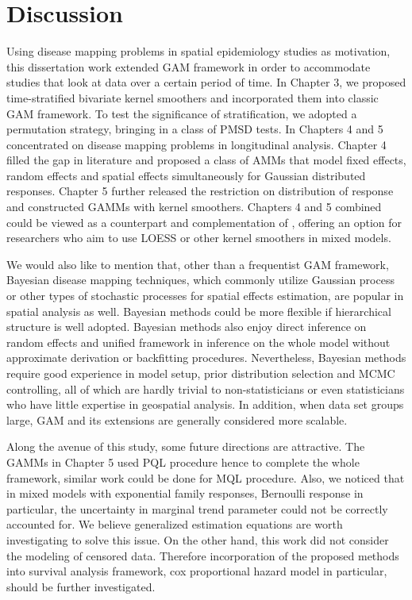 \chapter{Discussion}

Using disease mapping problems in spatial epidemiology studies as motivation, this dissertation work extended GAM framework in order to accommodate studies that look at data over a certain period of time. In Chapter 3, we proposed time-stratified bivariate kernel smoothers and incorporated them into classic GAM framework. To test the significance of stratification, we adopted a permutation strategy, bringing in a class of PMSD tests. In Chapters 4 and 5 concentrated on disease mapping problems in longitudinal analysis. Chapter 4 filled the gap in literature and proposed a class of AMMs that model fixed effects, random effects and spatial effects simultaneously for Gaussian distributed responses. Chapter 5 further released the restriction on distribution of response and constructed GAMMs with kernel smoothers. Chapters 4 and 5 combined could be viewed as a counterpart and complementation of \citet{lin1999inference}, offering an option for researchers who aim to use LOESS or other kernel smoothers in mixed models. 

We would also like to mention that, other than a frequentist GAM framework, Bayesian disease mapping techniques, which commonly utilize Gaussian process or other types of stochastic processes for spatial effects estimation, are popular in spatial analysis as well. Bayesian methods could be more flexible if hierarchical structure is well adopted. Bayesian methods also enjoy direct inference on random effects and unified framework in inference on the whole model without approximate derivation or backfitting procedures. Nevertheless, Bayesian methods require good experience in model setup, prior distribution selection and MCMC controlling, all of which are hardly trivial to non-statisticians or even statisticians who have little expertise in geospatial analysis. In addition, when data set groups large, GAM and its extensions are generally considered more scalable. 

Along the avenue of this study, some future directions are attractive. The GAMMs in Chapter 5 used PQL procedure hence to complete the whole framework, similar work could be done for MQL procedure. Also, we noticed that in mixed models with exponential family responses, Bernoulli response in particular, the uncertainty in marginal trend parameter could not be correctly accounted for. We believe generalized estimation equations are worth investigating to solve this issue. On the other hand, this work did not consider the modeling of censored data. Therefore incorporation of the proposed methods into survival analysis framework, cox proportional hazard model in particular, should be further investigated.

